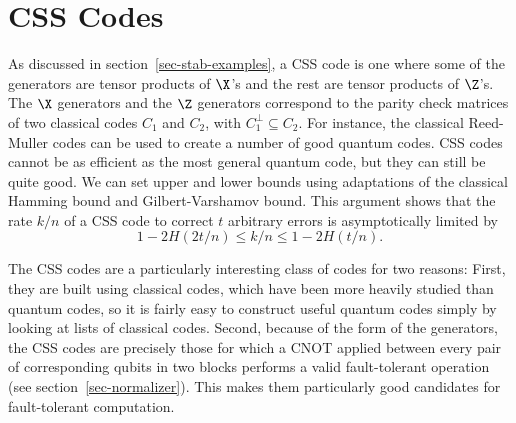 \section{CSS Codes}
\label{sec-CSS}

As discussed in section~\ref{sec-stab-examples}, a CSS code
\cite{calderbank-CSS,steane-CSS} is one where
some of the generators are tensor products of $\X$'s and the rest are tensor
products of $\Z$'s.  The $\X$ generators and the $\Z$ generators correspond
to the parity check matrices of two classical codes $C_1$ and $C_2$, with
$C_1^{\perp} \subseteq C_2$.  For instance, the classical Reed-Muller codes
can be used to create a number of good quantum codes.  CSS codes cannot be
as efficient as the most general quantum code, but they can still be quite
good.  We can set upper and lower bounds using adaptations of the classical
Hamming bound and Gilbert-Varshamov bound.  This argument shows that the
rate $k/n$ of a CSS code to correct $t$ arbitrary errors is asymptotically
limited by
\begin{equation}
	1 - 2 H(2t/n) \leq k/n \leq 1 - 2 H(t/n).
\end{equation}

The CSS codes are a particularly interesting class of codes for two reasons:
First, they are built using classical codes, which have been more heavily
studied than quantum codes, so it is fairly easy to construct useful quantum
codes simply by looking at lists of classical codes.  Second, because of
the form of the generators, the CSS codes are precisely those for which a
CNOT applied between every pair of corresponding qubits in two blocks performs
a valid fault-tolerant operation (see section~\ref{sec-normalizer}).  This
makes them particularly good candidates for fault-tolerant computation.

